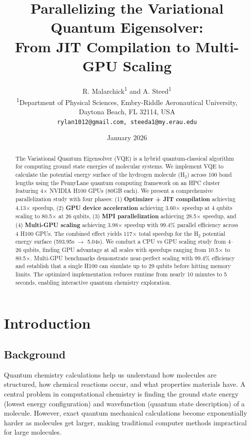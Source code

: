 \documentclass[11pt]{article}
\title{Parallelizing the Variational Quantum Eigensolver: \\
From JIT Compilation to Multi-GPU Scaling}
\author{
R. Malarchick\textsuperscript{1} and A. Steed\textsuperscript{1} \\[0.5em]
\textsuperscript{1}Department of Physical Sciences, Embry-Riddle Aeronautical University, \\
Daytona Beach, FL 32114, USA \\[0.5em]
\texttt{rylan1012@gmail.com, steeda1@my.erau.edu}
}
\date{January 2026}
\begin{document}
\maketitle

\begin{abstract}
    The Variational Quantum Eigensolver (VQE) is a hybrid quantum-classical algorithm for computing ground state energies of molecular systems. We implement VQE to calculate the potential energy surface of the hydrogen molecule (H$_2$) across 100 bond lengths using the PennyLane quantum computing framework on an HPC cluster featuring 4$\times$ NVIDIA H100 GPUs (80GB each). We present a comprehensive parallelization study with four phases: (1) \textbf{Optimizer + JIT compilation} achieving 4.13$\times$ speedup, (2) \textbf{GPU device acceleration} achieving 3.60$\times$ speedup at 4 qubits scaling to 80.5$\times$ at 26 qubits, (3) \textbf{MPI parallelization} achieving 28.5$\times$ speedup, and (4) \textbf{Multi-GPU scaling} achieving 3.98$\times$ speedup with 99.4\% parallel efficiency across 4 H100 GPUs. The combined effect yields 117$\times$ total speedup for the H$_2$ potential energy surface (593.95s $\rightarrow$ 5.04s). We conduct a CPU vs GPU scaling study from 4--26 qubits, finding GPU advantage at all scales with speedups ranging from 10.5$\times$ to 80.5$\times$. Multi-GPU benchmarks demonstrate near-perfect scaling with 99.4\% efficiency and establish that a single H100 can simulate up to 29 qubits before hitting memory limits. The optimized implementation reduces runtime from nearly 10 minutes to 5 seconds, enabling interactive quantum chemistry exploration.
\end{abstract}

\section{Introduction}

\subsection{Background}

Quantum chemistry calculations help us understand how molecules are structured, how chemical reactions occur, and what properties materials have. A central problem in computational chemistry is finding the ground state energy (lowest energy configuration) and wavefunction (quantum state description) of a molecule. However, exact quantum mechanical calculations become exponentially harder as molecules get larger, making traditional computer methods impractical for large molecules.
\end{document}
